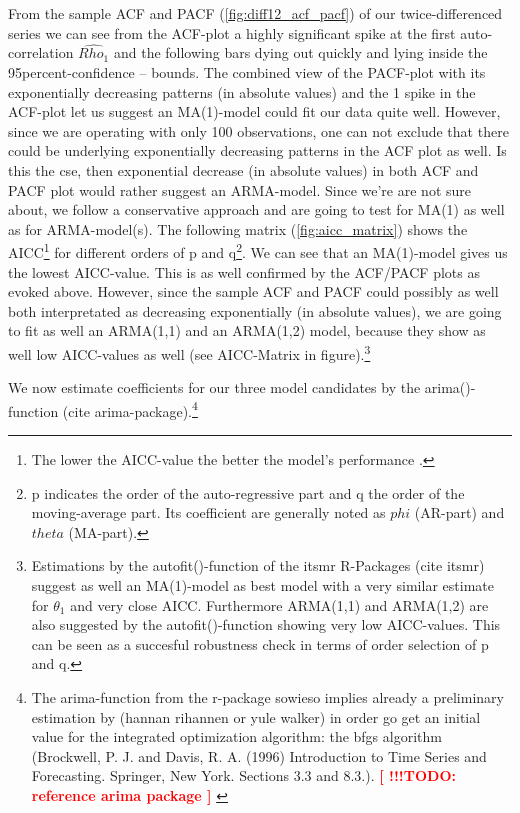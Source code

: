 \documentclass[11pt,a4paper]{article}
\newcommand{\TODO}[1]{%
    \textcolor{red}{ %
        \textbf{[ !!!TODO: #1 ]}%
    }%
    \PackageWarning{TODO:}{TODO: #1}%
}
\begin{document}
From the sample ACF and PACF (\cref{fig:diff12_acf_pacf}) of our twice-differenced series we can see from the ACF-plot a highly significant spike at the first auto-correlation $\hat{Rho_1}$ and the following bars dying out quickly and lying inside the 95percent-confidence – bounds.
The combined view of the PACF-plot with its exponentially decreasing patterns (in absolute values) and the 1 spike in the ACF-plot let us suggest an MA(1)-model could fit our data quite well.
However, since we are operating with only 100 observations, one can not exclude that there could be underlying exponentially decreasing patterns in the ACF plot as well.
Is this the cse, then exponential decrease (in absolute values) in both ACF and PACF plot would rather suggest an ARMA-model.
Since  we’re are not sure about, we follow a conservative approach and are going to test for MA(1) as well as for ARMA-model(s).
The following matrix (\cref{fig:aicc_matrix}) shows the AICC\footnote{
    The lower the AICC-value the better the model's performance \citep{aic86}.
} for different orders of p and q\footnote{
    p indicates the order of the auto-regressive part and q the order of the moving-average part.
    Its coefficient are generally noted as $phi$ (AR-part) and $theta$ (MA-part).
}.
We can see that an MA(1)-model gives us the lowest AICC-value.
This is as well confirmed by the ACF/PACF plots as evoked above.
However, since the sample ACF and PACF could possibly as well both interpretated as decreasing exponentially (in absolute values), we are going to fit as well an ARMA(1,1) and an ARMA(1,2) model, because they show as well low AICC-values as well (see AICC-Matrix in figure).\footnote{
    Estimations by the autofit()-function of the itsmr R-Packages (cite itsmr) suggest as well an MA(1)-model as best model with a very similar estimate for $\theta_1$ and very close AICC.
    Furthermore ARMA(1,1) and ARMA(1,2) are also suggested by the autofit()-function showing very low AICC-values.
    This can be seen as a succesful robustness check in terms of order selection of p and q.
}

We now estimate coefficients for our three model candidates by the arima()-function (cite arima-package).\footnote{
    The arima-function from the r-package sowieso implies already a preliminary estimation by (hannan rihannen or yule walker) in order go get an initial value for the integrated optimization algorithm:
    the bfgs algorithm (Brockwell, P. J. and Davis, R. A. (1996) Introduction to Time Series and Forecasting. Springer, New York. Sections 3.3 and 8.3.).
    \TODO{reference arima package}
}
\end{document}
